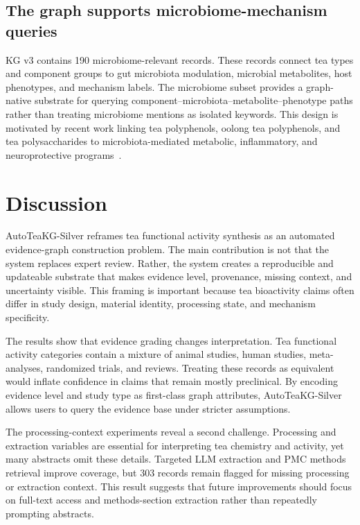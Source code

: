 \documentclass[11pt]{article}
\begin{document}
\subsection{The graph supports microbiome-mechanism queries}

KG v3 contains 190 microbiome-relevant records. These records connect tea types and component groups to gut microbiota modulation, microbial metabolites, host phenotypes, and mechanism labels. The microbiome subset provides a graph-native substrate for querying component--microbiota--metabolite--phenotype paths rather than treating microbiome mentions as isolated keywords. This design is motivated by recent work linking tea polyphenols, oolong tea polyphenols, and tea polysaccharides to microbiota-mediated metabolic, inflammatory, and neuroprotective programs~\cite{zhao2024processed_tea_microbiota,song2024oolong_neuroprotection,tian2024obesity_microbiota,zhang2024fermented_tea_microbiota,arce2025kombucha_rct}.

\section{Discussion}

AutoTeaKG-Silver reframes tea functional activity synthesis as an automated evidence-graph construction problem. The main contribution is not that the system replaces expert review. Rather, the system creates a reproducible and updateable substrate that makes evidence level, provenance, missing context, and uncertainty visible. This framing is important because tea bioactivity claims often differ in study design, material identity, processing state, and mechanism specificity.

The results show that evidence grading changes interpretation. Tea functional activity categories contain a mixture of animal studies, human studies, meta-analyses, randomized trials, and reviews. Treating these records as equivalent would inflate confidence in claims that remain mostly preclinical. By encoding evidence level and study type as first-class graph attributes, AutoTeaKG-Silver allows users to query the evidence base under stricter assumptions.

The processing-context experiments reveal a second challenge. Processing and extraction variables are essential for interpreting tea chemistry and activity, yet many abstracts omit these details. Targeted LLM extraction and PMC methods retrieval improve coverage, but 303 records remain flagged for missing processing or extraction context. This result suggests that future improvements should focus on full-text access and methods-section extraction rather than repeatedly prompting abstracts.
\end{document}
